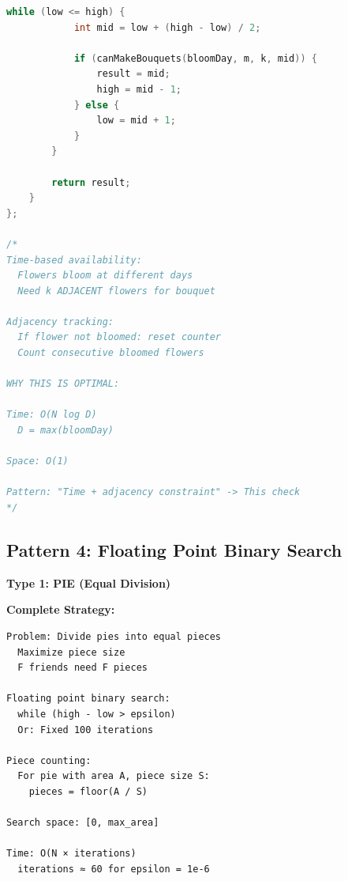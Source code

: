 \documentclass[11pt,a4paper,oneside]{book}
\begin{document}
\begin{lstlisting}[language=C++, caption=Complete Time Interval Solutions]
        while (low <= high) {
            int mid = low + (high - low) / 2;
            
            if (canMakeBouquets(bloomDay, m, k, mid)) {
                result = mid;
                high = mid - 1;
            } else {
                low = mid + 1;
            }
        }
        
        return result;
    }
};

/*
Time-based availability:
  Flowers bloom at different days
  Need k ADJACENT flowers for bouquet
  
Adjacency tracking:
  If flower not bloomed: reset counter
  Count consecutive bloomed flowers

WHY THIS IS OPTIMAL:

Time: O(N log D)
  D = max(bloomDay)

Space: O(1)

Pattern: "Time + adjacency constraint" -> This check
*/
\end{lstlisting}

\subsection{Pattern 4: Floating Point Binary Search}

\begin{tcolorbox}[
    enhanced,breakable,
    colback=dangered!10,
    colframe=dangered,
    boxrule=2pt,
    arc=4mm,
    title=\textbf{Complete Floating Point Binary Search}
]
\textbf{Type 1: PIE (Equal Division)}

\textbf{Complete Strategy:}
\begin{verbatim}
Problem: Divide pies into equal pieces
  Maximize piece size
  F friends need F pieces

Floating point binary search:
  while (high - low > epsilon)
  Or: Fixed 100 iterations

Piece counting:
  For pie with area A, piece size S:
    pieces = floor(A / S)

Search space: [0, max_area]

Time: O(N × iterations)
  iterations ≈ 60 for epsilon = 1e-6
\end{verbatim}
\end{tcolorbox}
\end{document}
